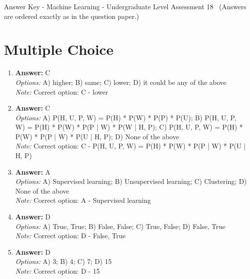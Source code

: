 \documentclass[12pt]{article}
\begin{document}
\begin{center}
Answer Key - Machine Learning - Undergraduate Level Assessment 18 \
\small (Answers are ordered exactly as in the question paper.)
\end{center}

\section*{Multiple Choice}
\begin{enumerate}[label=\arabic*.]
\item \textbf{Answer:} C
\\ \textit{Options:} A) higher; B) same; C) lower; D) it could be any of the above
\\ \textit{Note:} Correct option: C - lower
\item \textbf{Answer:} C
\\ \textit{Options:} A) P(H, U, P, W) = P(H) * P(W) * P(P) * P(U); B) P(H, U, P, W) = P(H) * P(W) * P(P | W) * P(W | H, P); C) P(H, U, P, W) = P(H) * P(W) * P(P | W) * P(U | H, P); D) None of the above
\\ \textit{Note:} Correct option: C - P(H, U, P, W) = P(H) * P(W) * P(P | W) * P(U | H, P)
\item \textbf{Answer:} A
\\ \textit{Options:} A) Supervised learning; B) Unsupervised learning; C) Clustering; D) None of the above
\\ \textit{Note:} Correct option: A - Supervised learning
\item \textbf{Answer:} D
\\ \textit{Options:} A) True, True; B) False, False; C) True, False; D) False, True
\\ \textit{Note:} Correct option: D - False, True
\item \textbf{Answer:} D
\\ \textit{Options:} A) 3; B) 4; C) 7; D) 15
\\ \textit{Note:} Correct option: D - 15
\end{enumerate}
\end{document}
